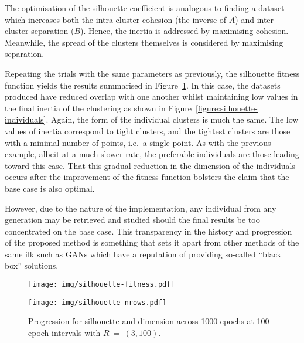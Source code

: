 The optimisation of the silhouette coefficient is analogous to finding a dataset
which increases both the intra-cluster cohesion (the inverse of \(A\)) and
inter-cluster separation (\(B\)). Hence, the inertia is addressed by maximising
cohesion. Meanwhile, the spread of the clusters themselves is considered by
maximising separation.

Repeating the trials with the same parameters as previously, the silhouette
fitness function yields the results summarised in
Figure~\ref{figure:silhouette}. In this case, the datasets produced have reduced
overlap with one another whilst maintaining low values in the final inertia of
the clustering as shown in Figure~\ref{figure:silhouette-individuals}. Again,
the form of the individual clusters is much the same. The low values of inertia
correspond to tight clusters, and the tightest clusters are those with a minimal
number of points, i.e.\ a single point. As with the previous example, albeit at
a much slower rate, the preferable individuals are those leading toward this
case. That this gradual reduction in the dimension of the individuals occurs
after the improvement of the fitness function bolsters the claim that the base
case is also optimal.

However, due to the nature of the implementation, any individual from any
generation may be retrieved and studied should the final results be too
concentrated on the base case. This transparency in the history and progression
of the proposed method is something that sets it apart from other methods of the
same ilk such as GANs which have a reputation of providing so-called ``black
box'' solutions.

\begin{figure}[htbp]
    \ContinuedFloat*
    \centering
    \begin{minipage}{\imgwidth}
        \centering
        \texttt{[image: img/silhouette-fitness.pdf]}
    \end{minipage}

    \begin{minipage}{\imgwidth}
        \centering
        \texttt{[image: img/silhouette-nrows.pdf]}
    \end{minipage}
    \caption{Progression for silhouette and dimension across 1000 epochs at 100
             epoch intervals with \(R~=~(3,100)\).}\label{figure:silhouette}
\end{figure}

